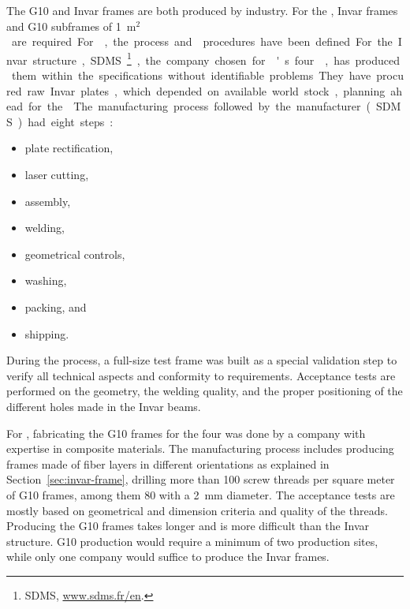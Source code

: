 The G10 and Invar frames are both produced by industry. For the , %
\dptotcrp Invar frames and \dpnumpmtch %
G10 subframes of \SI{1}{m$^2$} are required. %
For , the process and  procedures have been defined.
For the Invar structure, SDMS\footnote{SDMS\texttrademark{}, \url{www.sdms.fr/en}.}, the company chosen for 's four ,  %
has produced them within the specifications without identifiable problems.
They have procured raw Invar plates, which depended on available world stock, planning ahead for the . 
The manufacturing process followed by the manufacturer (SDMS) had eight steps:\\
\begin{itemize}
\item plate rectification,
\item  laser cutting,
\item  assembly,
\item  welding,
\item  geometrical controls,
\item  washing,
\item  packing, and
\item  shipping.
\end{itemize}

During the process, a full-size test frame was built as a special validation step to verify all technical aspects and conformity to requirements. 
Acceptance tests are performed on the geometry, the welding quality, and the proper positioning of the different holes made in the Invar beams.

For , fabricating the G10 frames for the four  was done by a company with expertise in composite materials. The manufacturing process includes  %
producing frames made of fiber layers in different orientations as explained in Section~\ref{sec:invar-frame}, drilling more than \num{100} screw threads per square meter of G10 frames, among them \num{80} with a \SI{2}{mm} diameter.
The acceptance tests are mostly based on geometrical and dimension criteria and quality of the threads.  
Producing the G10 frames takes longer and is more difficult than the Invar structure. G10 production would require a minimum of two production sites, while only one company would suffice to produce the Invar frames.


